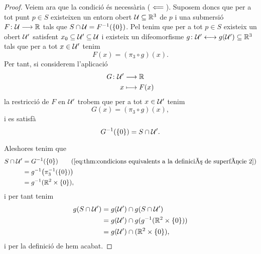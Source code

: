\documentclass[../../Main.tex]{subfiles}
\begin{document}
\begin{theorem}
\begin{proof}
			Veiem ara que la condició és necessària (\(\impliedby\)). Suposem doncs que per a tot punt \(p\in S\) existeixen un entorn obert \(\mathcal{U}\subseteq\mathbb{R}^{3}\) de \(p\) i una submersió \(F\colon\mathcal{U}\longrightarrow\mathbb{R}\) tals que \(S\cap\mathcal{U}=F^{-1}(\{0\})\). Pel  tenim que per a tot \(p\in S\) existeix un obert \(\mathcal{U}'\) satisfent \(x_{0}\subseteq\mathcal{U}'\subseteq\mathcal{U}\) i existeix un difeomorfisme \(g\colon\mathcal{U}'\longleftrightarrow g(\mathcal{U}')\subseteq\mathbb{R}^{3}\) tals que per a tot \(x\in\mathcal{U}'\) tenim
			\[F(x)=(\pi_{3}\circ g)(x).\]
			Per tant, si considerem l'aplicació
			\begin{align*}
				G\colon\mathcal{U}'&\longrightarrow\mathbb{R} \\
				x&\longmapsto F(x)
			\end{align*}
			la restricció de \(F\) en \(\mathcal{U}'\) trobem que per a tot \(x\in\mathcal{U}'\) tenim
			\[G(x)=(\pi_{3}\circ g)(x),\]
			i es satisfà
			\begin{equation}
				\label{eq:thm:condicions equivalents a la definició de superfície 2}
				G^{-1}(\{0\})=S\cap\mathcal{U}'.
			\end{equation}
			
			Aleshores tenim que
			\begin{align*}
				S\cap\obert{U}'&=G^{-1}(\{0\}) \tag{\ref{eq:thm:condicions equivalents a la definició de superfície 2}}\\
				&=g^{-1}\big(\pi_{3}^{-1}(\{0\})\big) \\
				&=g^{-1}(\mathbb{R}^{2}\times\{0\}),
			\end{align*}
			i per tant tenim
			\begin{align*}
				g(S\cap\mathcal{U}')&=g(\mathcal{U}')\cap g(S\cap\mathcal{U}') \\
				&=g(\mathcal{U}')\cap g(g^{-1}(\mathbb{R}^{2}\times\{0\})) \\
				&=g(\mathcal{U}')\cap(\mathbb{R}^{2}\times\{0\}),
			\end{align*}
			i per la definició de  hem acabat.
		\end{proof}
	\end{theorem}
\end{document}
